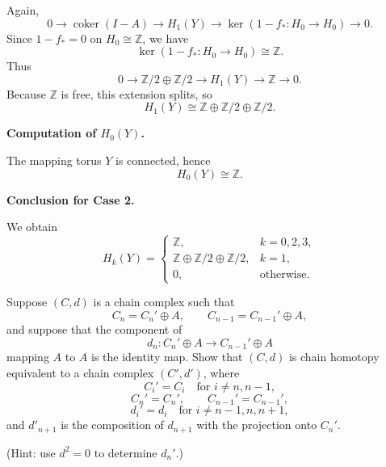 \begin{solution}
Again,
\[
0\to \operatorname{coker}(I-A)\to H_1(Y)\to \ker(1-f_*:H_0\to H_0)\to 0.
\]
Since \(1-f_*=0\) on \(H_0\cong \mathbb Z\), we have
\[
\ker(1-f_*:H_0\to H_0)\cong \mathbb Z.
\]
Thus
\[
0\to \mathbb Z/2\oplus \mathbb Z/2\to H_1(Y)\to \mathbb Z\to 0.
\]
Because \(\mathbb Z\) is free, this extension splits, so
\[
H_1(Y)\cong \mathbb Z\oplus \mathbb Z/2\oplus \mathbb Z/2.
\]


\medskip
\noindent\textbf{Computation of \(H_0(Y)\).}\par
\smallskip

The mapping torus \(Y\) is connected, hence
\[
H_0(Y)\cong \mathbb Z.
\]


\medskip
\noindent\textbf{Conclusion for Case 2.}\par
\smallskip

We obtain
\[
H_k(Y)=
\begin{cases}
	\mathbb Z, & k=0,2,3,\\
	\mathbb Z\oplus \mathbb Z/2\oplus \mathbb Z/2, & k=1,\\
	0, & \text{otherwise}.
\end{cases}
\]
\end{solution}

\begin{problem}
Suppose \((C,d)\) is a chain complex such that
\[
C_n=C_n'\oplus A,\qquad C_{n-1}=C_{n-1}'\oplus A,
\]
and suppose that the component of
\[
d_n:C_n'\oplus A\longrightarrow C_{n-1}'\oplus A
\]
mapping \(A\) to \(A\) is the identity map. Show that \((C,d)\) is chain homotopy equivalent to a chain complex \((C',d')\), where
\[
C_i'=C_i \quad \text{for } i\neq n,n-1,
\]
\[
C_n'=C_n',\qquad C_{n-1}'=C_{n-1}',
\]
\[
d_i'=d_i \quad \text{for } i\neq n-1,n,n+1,
\]
and \(d'_{n+1}\) is the composition of \(d_{n+1}\) with the projection onto \(C_n'\).

(Hint: use \(d^2=0\) to determine \(d_n'\).)

\par
\end{problem}

